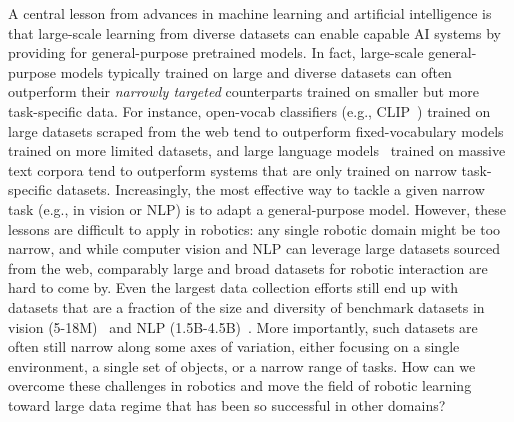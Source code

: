 \documentclass[letterpaper, 10 pt, conference]{ieeeconf}  %
\begin{document}

A central lesson from advances in machine learning and artificial intelligence is that large-scale learning from diverse datasets can enable capable AI systems by providing for general-purpose pretrained models. In fact, large-scale general-purpose models typically trained on large and diverse datasets can often outperform their \emph{narrowly targeted} counterparts trained on smaller but more task-specific data. For instance, open-vocab classifiers (e.g., CLIP~\cite{radford2021learning}) trained on large datasets scraped from the web tend to outperform fixed-vocabulary models trained on more limited datasets, and large language models~\cite{openai2023gpt4,anil2023palm} trained on massive text corpora tend to outperform systems that are only trained on narrow task-specific datasets. Increasingly, the most effective way to tackle a given narrow task (e.g., in vision or NLP) is to adapt a general-purpose model. However, these lessons are difficult to apply in robotics: any single robotic domain might be too narrow, and while computer vision and NLP can leverage large datasets sourced from the web, comparably large and broad datasets for robotic interaction are hard to come by. Even the largest data collection efforts still end up with datasets that are a fraction of the size and diversity of benchmark datasets in vision (5-18M)~\cite{Weyand_2020_CVPR, tencent-ml-images-2019} and NLP (1.5B-4.5B)~\cite{lehmann-2017, muhleisen2012web}. More importantly, such datasets are often still narrow along some axes of variation, either focusing on a single environment, a single set of objects, or a narrow range of tasks. How can we overcome these challenges in robotics and move the field of robotic learning toward large data regime that has been so successful in other domains?
\end{document}
